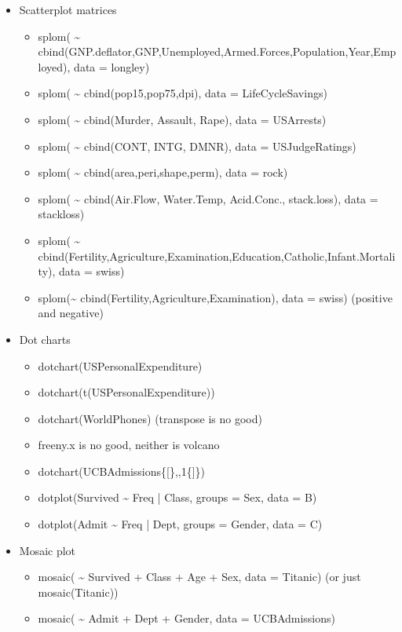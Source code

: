 \documentclass[10pt,english]{scrbook}
\begin{document}
\begin{itemize}
\item Scatterplot matrices
\begin{itemize}
\item splom( \textasciitilde{} cbind(GNP.deflator,GNP,Unemployed,Armed.Forces,Population,Year,Employed),  data = longley)
\item splom( \textasciitilde{} cbind(pop15,pop75,dpi), data = LifeCycleSavings)
\item splom( \textasciitilde{} cbind(Murder, Assault, Rape), data = USArrests)
\item splom( \textasciitilde{} cbind(CONT, INTG, DMNR), data = USJudgeRatings)
\item splom( \textasciitilde{} cbind(area,peri,shape,perm), data = rock)
\item splom( \textasciitilde{} cbind(Air.Flow, Water.Temp, Acid.Conc., stack.loss), data = stackloss)
\item splom( \textasciitilde{} cbind(Fertility,Agriculture,Examination,Education,Catholic,Infant.Mortality), data = swiss)
\item splom(\textasciitilde{} cbind(Fertility,Agriculture,Examination), data = swiss) (positive and negative)
\end{itemize}

\item Dot charts
\begin{itemize}
\item dotchart(USPersonalExpenditure)
\item dotchart(t(USPersonalExpenditure))
\item dotchart(WorldPhones) (transpose is no good)
\item freeny.x is no good, neither is volcano
\item dotchart(UCBAdmissions\{[\},,1\{]\})
\item dotplot(Survived \textasciitilde{} Freq | Class, groups = Sex, data = B)
\item dotplot(Admit \textasciitilde{} Freq | Dept, groups = Gender, data = C)
\end{itemize}

\item Mosaic plot
\begin{itemize}
\item mosaic( \textasciitilde{} Survived + Class + Age + Sex, data = Titanic) (or just mosaic(Titanic))
\item mosaic( \textasciitilde{} Admit + Dept + Gender, data = UCBAdmissions)
\end{itemize}


\end{itemize}
\end{document}
